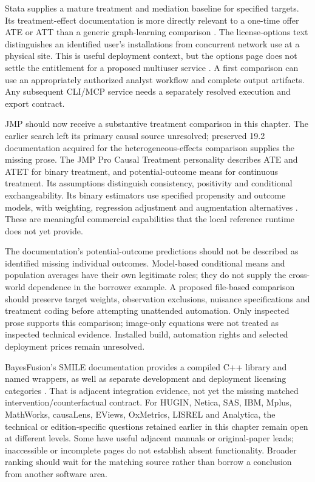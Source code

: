 Stata supplies a mature treatment and mediation baseline for specified targets.
Its treatment-effect documentation is more directly relevant to a one-time
offer ATE or ATT than a generic graph-learning comparison
\citep{exec13_ci_stata_causal_intro}. The license-options text distinguishes
an identified user's installations from concurrent network use at a physical
site. This is useful deployment context, but the options page does not settle
the entitlement for a proposed multiuser service
\citep{exec13_ivrd_license}. A first comparison can use an appropriately
authorized analyst workflow and complete output artifacts. Any subsequent
CLI/MCP service needs a separately resolved execution and export contract.

JMP should now receive a substantive treatment comparison in this chapter.
The earlier search left its primary causal source unresolved; preserved
19.2 documentation acquired for the heterogeneous-effects comparison supplies
the missing prose. The JMP Pro Causal Treatment personality describes ATE and
ATET for binary treatment, and potential-outcome means for continuous treatment.
Its assumptions distinguish consistency, positivity and conditional
exchangeability. Its binary estimators use specified propensity and outcome
models, with weighting, regression adjustment and augmentation alternatives
\citep{exec13_ch_jmp_causal}. These are meaningful commercial capabilities
that the local reference runtime does not yet provide.

The documentation's potential-outcome predictions should not be described as
identified missing individual outcomes. Model-based conditional means and
population averages have their own legitimate roles; they do not supply the
cross-world dependence in the borrower example. A proposed file-based
comparison should preserve target weights, observation exclusions, nuisance
specifications and treatment coding before attempting unattended automation.
Only inspected prose supports this comparison; image-only equations were not
treated as inspected technical evidence. Installed build, automation rights
and selected deployment prices remain unresolved.

BayesFusion's SMILE documentation provides a compiled C++ library and named
wrappers, as well as separate development and deployment licensing categories
\citep{exec13_smile_intro,exec13_smile_license}. That is adjacent integration
evidence, not yet the missing matched intervention/counterfactual contract.
For HUGIN, Netica, SAS, IBM, Mplus, MathWorks, causaLens, EViews, OxMetrics,
LISREL and Analytica, the technical or edition-specific questions retained
earlier in this chapter remain open at different levels. Some have useful
adjacent manuals or original-paper leads; inaccessible or incomplete pages
do not establish absent functionality. Broader ranking should wait for the
matching source rather than borrow a conclusion from another software area. \citep{exec14_ci_comparison}

